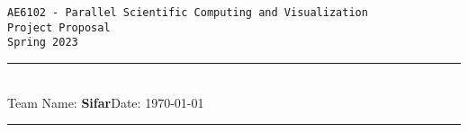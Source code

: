\documentclass[11pt,a4paper]{article}
\newcommand{\student}{\textbf{Sifar}}
\begin{document}
\thispagestyle{empty}
\begin{center}
	\texttt{\Large AE6102 - Parallel Scientific Computing and Visualization}\\
        \vspace*{0.2cm}
        \texttt{\Large Project Proposal}\\
        \vspace*{0.2cm}
	\texttt{\large Spring 2023}
\end{center}
\noindent
\rule{19cm}{0.2cm}\\[0.3cm]
Team Name: \student \hfill Date: \today\\[0.1cm]
\rule{19cm}{0.05cm}
\vspace{0.1cm}

\vspace*{-0.5cm}
\end{document}
